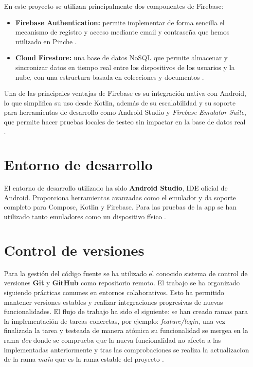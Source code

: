 En este proyecto se utilizan principalmente dos componentes de Firebase:

\begin{itemize}
    \item \textbf{Firebase Authentication:} permite implementar de forma sencilla el mecanismo de registro y acceso mediante email y contraseña que hemos utilizado en Pinche \cite{firebase-auth}.

    \item \textbf{Cloud Firestore:} una base de datos NoSQL que permite almacenar y sincronizar datos en tiempo real entre los dispositivos de los usuarios y la nube, con una estructura basada en colecciones y documentos \cite{firestore}.
\end{itemize}

Una de las principales ventajas de Firebase es su integración nativa con Android, lo que simplifica su uso desde Kotlin, además de su escalabilidad y su soporte para herramientas de desarrollo como Android Studio y \textit{Firebase Emulator Suite}, que permite hacer pruebas locales de testeo sin impactar en la base de datos real \cite{firebase-emulator}.

\section{Entorno de desarrollo}

El entorno de desarrollo utilizado ha sido \textbf{Android Studio}, IDE oficial de Android. Proporciona herramientas avanzadas como el emulador y da soporte completo para Compose, Kotlin y Firebase. Para las pruebas de la app se han utilizado tanto emuladores como un dispositivo físico \cite{android-studio}.

\section{Control de versiones}

Para la gestión del código fuente se ha utilizado el conocido sistema de control de versiones \textbf{Git} y \textbf{GitHub} como repositorio remoto. El trabajo se ha organizado siguiendo prácticas comunes en entornos colaborativos. Esto ha permitido mantener versiones estables y realizar integraciones progresivas de nuevas funcionalidades. El flujo de trabajo ha sido el siguiente: se han creado ramas para la implementación de tareas concretas, por ejemplo: \textit{feature/login}, una vez finalizada la tarea y testeada de manera atómica su funcionalidad se mergea en la rama \textit{dev} donde se comprueba que la nueva funcionalidad no afecta a las implementadas anteriormente y tras las comprobaciones se realiza la actualizacion de la rama \textit{main} que es la rama estable del proyecto \cite{git, github}.

